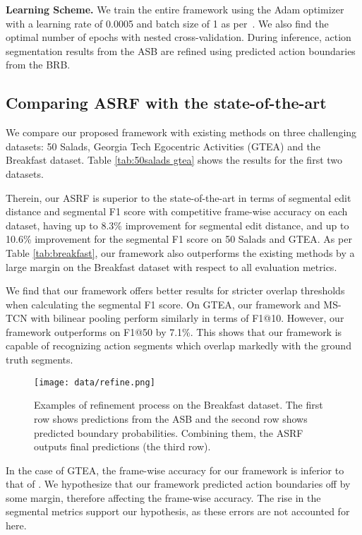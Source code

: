 \documentclass[10pt,twocolumn,letterpaper]{article}
\begin{document}
\textbf{Learning Scheme.}
We train the entire framework using the Adam optimizer with a learning rate of 0.0005 and batch size of 1 as per~\cite{mstcn}.
We also find the optimal number of epochs with nested cross-validation.
During inference, action segmentation results from the ASB are refined using predicted action boundaries from the BRB. 




\subsection{Comparing ASRF with the state-of-the-art}
\label{sec:sota}
We compare our proposed framework with existing methods on three challenging datasets: 50 Salads, Georgia Tech Egocentric Activities (GTEA) and the Breakfast dataset. 
Table \ref{tab:50salads gtea} shows the results for the first two datasets.

Therein, our ASRF is superior to the state-of-the-art in terms of segmental edit distance and segmental F1 score with competitive frame-wise accuracy on each dataset,
having up to 8.3\% improvement for segmental edit distance, and up to 10.6\% improvement for the segmental F1 score on 50 Salads and GTEA.
As per Table \ref{tab:breakfast}, our framework also outperforms the existing methods by a large margin on the Breakfast dataset with respect to all evaluation metrics.

We find that our framework offers better results for stricter overlap thresholds when calculating the segmental F1 score.
On GTEA, our framework and MS-TCN with bilinear pooling \cite{bpgaussian} perform similarly in terms of F1@10.
However, our framework outperforms \cite{bpgaussian} on F1@50 by 7.1\%.
This shows that our framework is capable of recognizing action segments which overlap markedly with the ground truth segments.


\begin{figure*}[h]
    \small
    \begin{center}
    \texttt{[image: data/refine.png]}
    \end{center}
    \caption{Examples of refinement process on the Breakfast dataset. The first row shows predictions from the ASB and the second row shows predicted boundary probabilities.
    Combining them, the ASRF outputs final predictions (the third row).}
    \label{fig:refine}
    \vspace{-5pt}
\end{figure*}

In the case of GTEA, the frame-wise accuracy for our framework is inferior to that of \cite{bpgaussian}.
We hypothesize that our framework predicted action boundaries off by some margin, therefore affecting the frame-wise accuracy.
The rise in the segmental metrics support our hypothesis, as these errors are not accounted for here.
\end{document}
